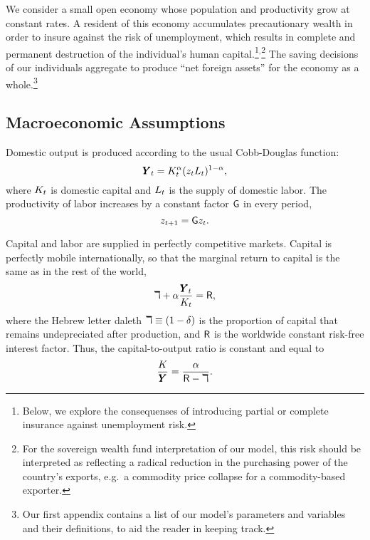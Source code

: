 \documentclass[titlepage,abstract,letterpaper]{econtex}
\renewcommand{\GDPLev}{\ensuremath{\pmb{Y}}}
\renewcommand{\ptyLev}{\ensuremath{z}}
\begin{document}
We consider a small open economy whose population and productivity
grow at constant rates. A resident of this economy accumulates
precautionary wealth in order to insure against the risk of
unemployment, which results in complete and permanent destruction of
the individual's human capital.\footnote{Below, we explore the
  consequenses of introducing partial or complete insurance against
  unemployment risk.}$^{,}$\footnote{For the sovereign
  wealth fund interpretation of our model, this risk should be
  interpreted as reflecting a radical reduction in the purchasing
  power of the country's exports, e.g.\ a commodity price collapse for
  a commodity-based exporter.}
The saving decisions of our individuals aggregate to produce ``net
foreign assets'' for the economy as a whole.\footnote{Our first
  appendix contains a list of our model's parameters and variables and
  their definitions, to aid the reader in keeping track.}


\subsection{Macroeconomic Assumptions}

Domestic output is produced according to the usual Cobb-Douglas function:
\begin{equation}
\GDPLev_t=\KLev_t^{\kapShare}(\ptyLev_t \LLev_t)^{1-\kapShare},
\label{eq:Cobb-Douglas}
\end{equation}
where $K_t$ is domestic capital and $L_t$ is the supply of domestic labor. The productivity of labor increases by a constant factor $\mathsf{G}$ in every period,
\begin{equation*}
\ptyLev_{t+1}=\WGro \ptyLev_t.
\end{equation*}

Capital and labor are supplied in perfectly competitive markets. Capital is perfectly mobile internationally, so that the marginal return to capital is the same as in the rest of the world,
\begin{equation}
\DeprFac+\kapShare \frac{\GDPLev_t}{\KLev_t}=\Rfree,
\label{eq:MPK}
\end{equation}
where the Hebrew letter daleth $\daleth \equiv (1-\delta)$ is the proportion of capital that remains undepreciated after production, and $\mathsf{R}$ is the worldwide constant risk-free interest factor. Thus, the capital-to-output ratio is constant and equal to
\begin{equation}
\frac{\KLev}{\GDPLev}=\frac{\kapShare}{\Rfree-\DeprFac}.
\label{eq:KOyLev} %
\end{equation}
\end{document}
